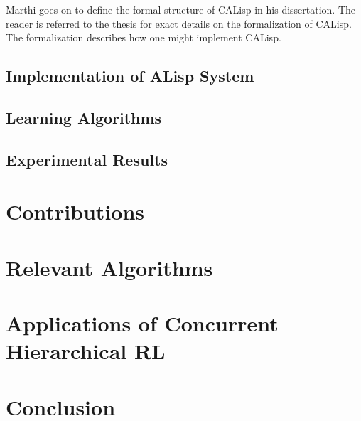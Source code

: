 \documentclass[jair,twoside,11pt,theapa]{article}
\begin{document}
Marthi goes on to define the formal structure of CALisp in his dissertation. The reader is referred to the thesis for exact details on the formalization of CALisp. The formalization describes how one might implement CALisp. 



\subsection{Implementation of ALisp System}
\label{Implementation}



\subsection{Learning Algorithms}
\label{Learning}

\subsection{Experimental Results}
\label{Experiments}

\section{Contributions}
\label{Contribs}

\section{Relevant Algorithms}
\label{relevant Algors}

\section{Applications of Concurrent Hierarchical RL}
\label{Applications}

\section{Conclusion}
\label{conclusion}

\vskip 0.2in


\end{document}
